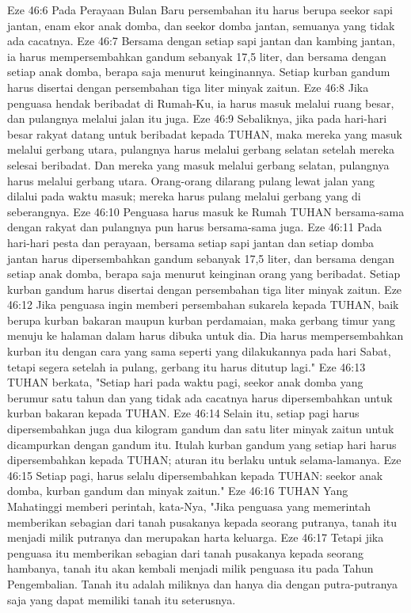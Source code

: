 Eze 46:6  Pada Perayaan Bulan Baru persembahan itu harus berupa seekor sapi jantan, enam ekor anak domba, dan seekor domba jantan, semuanya yang tidak ada cacatnya.
Eze 46:7  Bersama dengan setiap sapi jantan dan kambing jantan, ia harus mempersembahkan gandum sebanyak 17,5 liter, dan bersama dengan setiap anak domba, berapa saja menurut keinginannya. Setiap kurban gandum harus disertai dengan persembahan tiga liter minyak zaitun.
Eze 46:8  Jika penguasa hendak beribadat di Rumah-Ku, ia harus masuk melalui ruang besar, dan pulangnya melalui jalan itu juga.
Eze 46:9  Sebaliknya, jika pada hari-hari besar rakyat datang untuk beribadat kepada TUHAN, maka mereka yang masuk melalui gerbang utara, pulangnya harus melalui gerbang selatan setelah mereka selesai beribadat. Dan mereka yang masuk melalui gerbang selatan, pulangnya harus melalui gerbang utara. Orang-orang dilarang pulang lewat jalan yang dilalui pada waktu masuk; mereka harus pulang melalui gerbang yang di seberangnya.
Eze 46:10  Penguasa harus masuk ke Rumah TUHAN bersama-sama dengan rakyat dan pulangnya pun harus bersama-sama juga.
Eze 46:11  Pada hari-hari pesta dan perayaan, bersama setiap sapi jantan dan setiap domba jantan harus dipersembahkan gandum sebanyak 17,5 liter, dan bersama dengan setiap anak domba, berapa saja menurut keinginan orang yang beribadat. Setiap kurban gandum harus disertai dengan persembahan tiga liter minyak zaitun.
Eze 46:12  Jika penguasa ingin memberi persembahan sukarela kepada TUHAN, baik berupa kurban bakaran maupun kurban perdamaian, maka gerbang timur yang menuju ke halaman dalam harus dibuka untuk dia. Dia harus mempersembahkan kurban itu dengan cara yang sama seperti yang dilakukannya pada hari Sabat, tetapi segera setelah ia pulang, gerbang itu harus ditutup lagi."
Eze 46:13  TUHAN berkata, "Setiap hari pada waktu pagi, seekor anak domba yang berumur satu tahun dan yang tidak ada cacatnya harus dipersembahkan untuk kurban bakaran kepada TUHAN.
Eze 46:14  Selain itu, setiap pagi harus dipersembahkan juga dua kilogram gandum dan satu liter minyak zaitun untuk dicampurkan dengan gandum itu. Itulah kurban gandum yang setiap hari harus dipersembahkan kepada TUHAN; aturan itu berlaku untuk selama-lamanya.
Eze 46:15  Setiap pagi, harus selalu dipersembahkan kepada TUHAN: seekor anak domba, kurban gandum dan minyak zaitun."
Eze 46:16  TUHAN Yang Mahatinggi memberi perintah, kata-Nya, "Jika penguasa yang memerintah memberikan sebagian dari tanah pusakanya kepada seorang putranya, tanah itu menjadi milik putranya dan merupakan harta keluarga.
Eze 46:17  Tetapi jika penguasa itu memberikan sebagian dari tanah pusakanya kepada seorang hambanya, tanah itu akan kembali menjadi milik penguasa itu pada Tahun Pengembalian. Tanah itu adalah miliknya dan hanya dia dengan putra-putranya saja yang dapat memiliki tanah itu seterusnya.

